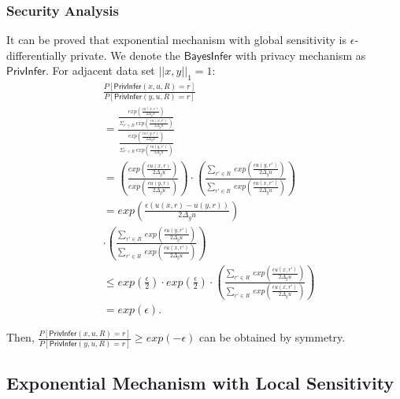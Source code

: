 \documentclass{article}
\begin{document}

\subsubsection{Security Analysis}
It can be proved that exponential mechanism with global sensitivity is $\epsilon$-differentially private. We denote the $\mathsf{BayesInfer}$ with privacy mechanism as $\mathsf{PrivInfer}$. For adjacent data set $||x,y||_1 = 1$:
\begin{equation*}
\begin{split}
& \frac{P[\mathsf{PrivInfer}(x,u,R) = r]}{P[\mathsf{PrivInfer}(y,u,R) = r]} \\
& =\frac
{\frac
{exp(\frac{\epsilon u(x,r)}{2 \Delta_{g}u})}
{\Sigma_{r' \in R}\ exp(\frac{\epsilon u(x,r')}{2 \Delta_{g}u})}}
{\frac
{exp(\frac{\epsilon u(y,r)}{2 \Delta_{g}u})}
{\Sigma_{r' \in R}\ exp(\frac{\epsilon u(y,r')}{2 \Delta_{g}u})}} \\
& = \left(\frac
{exp(\frac{\epsilon u(x,r)}{2 \Delta_{g}u})}
{exp(\frac{\epsilon u(y,r)}{2 \Delta_{g}u})}
\right)
\cdot
\left(\frac
{\sum\limits_{r' \in R}\ exp(\frac{\epsilon u(y,r')}{2 \Delta_{g}u})}
{\sum\limits_{r' \in R}\ exp(\frac{\epsilon u(x,r')}{2 \Delta_{g}u})}
\right)\\
& = exp\left(\frac
{\epsilon (u(x,r) - u(y,r))}
{2 \Delta_{g}u}
\right) \\
& \cdot
\left(\frac
{\sum\limits_{r' \in R}\ exp(\frac{\epsilon u(y,r')}{2 \Delta_{g}u})}
{\sum\limits_{r' \in R}\ exp(\frac{\epsilon u(x,r')}{2 \Delta_{g}u})}
\right)\\
& \leq
exp(\frac{\epsilon}{2}) \cdot exp(\frac{\epsilon}{2}) \cdot
\left(\frac
{\sum\limits_{r' \in R}\ exp(\frac{\epsilon u(x,r')}{2 \Delta_{g}u})}
{\sum\limits_{r' \in R}\ exp(\frac{\epsilon u(x,r')}{2 \Delta_{g}u})}
\right)\\
& = exp(\epsilon).
\end{split}
\end{equation*}

Then, $\frac{P[\mathsf{PrivInfer}(x,u,R) = r]}{P[\mathsf{PrivInfer}(y,u,R) = r]} \geq exp(-\epsilon)$ can be obtained by symmetry.


\subsection{Exponential Mechanism with Local Sensitivity}
\label{subsec_emls}
\end{document}
